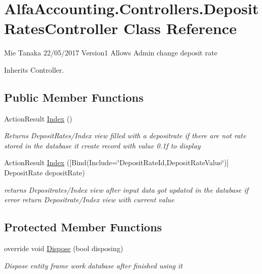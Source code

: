 \hypertarget{class_alfa_accounting_1_1_controllers_1_1_deposit_rates_controller}{}\section{Alfa\+Accounting.\+Controllers.\+Deposit\+Rates\+Controller Class Reference}
\label{class_alfa_accounting_1_1_controllers_1_1_deposit_rates_controller}


Mie Tanaka 22/05/2017 Version1 Allows Admin change deposit rate  




Inherits Controller.

\subsection*{Public Member Functions}
\begin{DoxyCompactItemize}
\item 
Action\+Result \hyperlink{class_alfa_accounting_1_1_controllers_1_1_deposit_rates_controller_abfe77c962214c2d2b8eb58419fc6ad55}{Index} ()
\begin{DoxyCompactList}\small\item\em Returns Deposit\+Rates/\+Index view filled with a depositrate if there are not rate stored in the database it create record with value 0.\+1f to display \end{DoxyCompactList}\item 
Action\+Result \hyperlink{class_alfa_accounting_1_1_controllers_1_1_deposit_rates_controller_a3aa92fede4c4258ab97202ac2788b0d9}{Index} (\mbox{[}Bind(Include=\char`\"{}Deposit\+Rate\+Id,Deposit\+Rate\+Value\char`\"{})\mbox{]} Deposit\+Rate deposit\+Rate)
\begin{DoxyCompactList}\small\item\em returns Depositrates/\+Index view after input data got updated in the database if error return Depositrate/\+Index view with current value \end{DoxyCompactList}\end{DoxyCompactItemize}
\subsection*{Protected Member Functions}
\begin{DoxyCompactItemize}
\item 
override void \hyperlink{class_alfa_accounting_1_1_controllers_1_1_deposit_rates_controller_a2f88e729e458962cfddc8428ebfc2a06}{Dispose} (bool disposing)
\begin{DoxyCompactList}\small\item\em Dispose entity frame work database after finished using it \end{DoxyCompactList}\end{DoxyCompactItemize}
